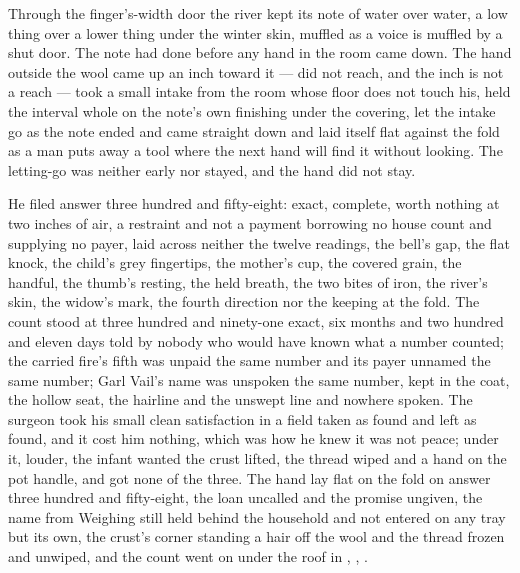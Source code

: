 Through the finger's-width door the river kept its note of water over water, a low thing over a lower thing under the winter skin, muffled as a voice is muffled by a shut door. The note had done before any hand in the room came down. The hand outside the wool came up an inch toward it --- did not reach, and the inch is not a reach --- took a small intake from the room whose floor does not touch his, held the interval whole on the note's own finishing under the covering, let the intake go as the note ended and came straight down and laid itself flat against the fold as a man puts away a tool where the next hand will find it without looking. The letting-go was neither early nor stayed, and the hand did not stay.

He filed answer three hundred and fifty-eight: exact, complete, worth nothing at two inches of air, a restraint and not a payment borrowing no house count and supplying no payer, laid across neither the twelve readings, the bell's gap, the flat knock, the child's grey fingertips, the mother's cup, the covered grain, the handful, the thumb's resting, the held breath, the two bites of iron, the river's skin, the widow's mark, the fourth direction nor the keeping at the fold. The count stood at three hundred and ninety-one exact, six months and two hundred and eleven days told by nobody who would have known what a number counted; the carried fire's fifth was unpaid the same number and its payer unnamed the same number; Garl Vail's name was unspoken the same number, kept in the coat, the hollow seat, the hairline and the unswept line and nowhere spoken. The surgeon took his small clean satisfaction in a field taken as found and left as found, and it cost him nothing, which was how he knew it was not peace; under it, louder, the infant wanted the crust lifted, the thread wiped and a hand on the pot handle, and got none of the three. The hand lay flat on the fold on answer three hundred and fifty-eight, the loan uncalled and the promise ungiven, the name from Weighing still held behind the household and not entered on any tray but its own, the crust's corner standing a hair off the wool and the thread frozen and unwiped, and the count went on under the roof in , , .
